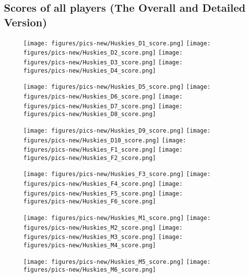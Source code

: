 \documentclass{mcmthesis}
\begin{document}
\begin{appendices}
\section{Scores of all players (The Overall and Detailed Version)} \label{score}
\begin{figure}[h]\centering
\texttt{[image: figures/pics-new/Huskies\_D1\_score.png]}
\texttt{[image: figures/pics-new/Huskies\_D2\_score.png]}
\texttt{[image: figures/pics-new/Huskies\_D3\_score.png]}
\texttt{[image: figures/pics-new/Huskies\_D4\_score.png]}
\end{figure}
\begin{figure}[h]\centering
\texttt{[image: figures/pics-new/Huskies\_D5\_score.png]}
\texttt{[image: figures/pics-new/Huskies\_D6\_score.png]}
\texttt{[image: figures/pics-new/Huskies\_D7\_score.png]}
\texttt{[image: figures/pics-new/Huskies\_D8\_score.png]}
\end{figure}
\begin{figure}[h]\centering
\texttt{[image: figures/pics-new/Huskies\_D9\_score.png]}
\texttt{[image: figures/pics-new/Huskies\_D10\_score.png]}
\texttt{[image: figures/pics-new/Huskies\_F1\_score.png]}
\texttt{[image: figures/pics-new/Huskies\_F2\_score.png]}
\end{figure}
\begin{figure}[h]\centering
\texttt{[image: figures/pics-new/Huskies\_F3\_score.png]}
\texttt{[image: figures/pics-new/Huskies\_F4\_score.png]}
\texttt{[image: figures/pics-new/Huskies\_F5\_score.png]}
\texttt{[image: figures/pics-new/Huskies\_F6\_score.png]}
\end{figure}
\begin{figure}[h]\centering
\texttt{[image: figures/pics-new/Huskies\_M1\_score.png]}
\texttt{[image: figures/pics-new/Huskies\_M2\_score.png]}
\texttt{[image: figures/pics-new/Huskies\_M3\_score.png]}
\texttt{[image: figures/pics-new/Huskies\_M4\_score.png]}
\end{figure}
\begin{figure}[h]\centering
\texttt{[image: figures/pics-new/Huskies\_M5\_score.png]}
\texttt{[image: figures/pics-new/Huskies\_M6\_score.png]}

\end{figure}
\end{appendices}
\end{document}
